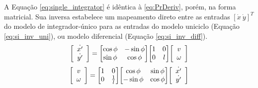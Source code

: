 A Equação \ref{eq:single_integrator} é idêntica à \ref{eq:PrDeriv}, porém, na
forma matricial. Sua inversa estabelece um mapeamento direto entre as entradas
$[\dot{x}\ \dot{y}]^T$ do modelo de integrador-único para as entradas do modelo
uniciclo (Equação \ref{eq:si_inv_uni}), ou modelo diferencial (Equação
\ref{eq:si_inv_diff}).
\begin{equation}
	\label{eq:single_integrator}
	\mleft[ 
	\begin{array}{c c}
	\dot{x'} \\ \dot{y'}
	\end{array}
	\mright] = \mleft[
	\begin{matrix}
		  \cos{\phi} & -\sin{\phi} \\
		  \sin{\phi} & \cos{\phi} \\
	\end{matrix}
	\mright] \mleft[
	\begin{matrix}
		  1 & 0 \\
		  0 & l \\
	\end{matrix}
	\mright] \mleft[ 
	\begin{array}{c c}
	v \\ \omega
	\end{array}
	\mright]
\end{equation}
\begin{equation}
	\label{eq:si_inv_uni}
	\mleft[ 
	\begin{array}{c c}
	v \\ \omega
	\end{array}
	\mright] = \mleft[
	\begin{matrix}
		  1 & 0 \\
		  0 & \frac{1}{l} \\
	\end{matrix}
	\mright] \mleft[
	\begin{matrix}
		  \cos{\phi} & \sin{\phi} \\
		  -\sin{\phi} & \cos{\phi} \\
	\end{matrix}
	\mright] \mleft[ 
	\begin{array}{c c}
	\dot{x'} \\ \dot{y'}
	\end{array}
	\mright]
\end{equation}
